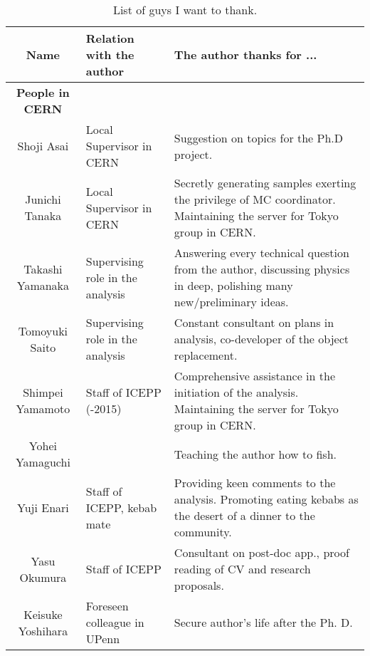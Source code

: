 \clearpage

\begin{table}[h]    
  \small
  \centering
  \caption{List of guys I want to thank.}
  \label{tab::Acknowledgement2}
  \begin{tabularx}{\linewidth}{clX}
    \toprule
    Name               & Relation with the author        & The author thanks for ... \\
    \midrule
    \midrule
    \textbf{People in CERN}     &               & \\
    \midrule
    Shoji Asai         &   Local Supervisor in CERN                                                       &  Suggestion on topics for the Ph.D project.   \\
    Junichi Tanaka     &   Local Supervisor in CERN                                                       &  Secretly generating samples exerting the privilege of MC coordinator. Maintaining the server for Tokyo group in CERN.   \\
    Takashi Yamanaka   &   Supervising role in the analysis                                                  &  Answering every technical question from the author, discussing physics in deep, polishing many new/preliminary ideas.  \\
    Tomoyuki Saito     &   Supervising role in the analysis                                                  &  Constant consultant on plans in analysis, co-developer of the object replacement.   \\   
    Shimpei Yamamoto   &   Staff of ICEPP (-2015)                                                         &  Comprehensive assistance in the initiation of the analysis. Maintaining the server for Tokyo group in CERN.  \\   
    Yohei Yamaguchi    &                                                                                  &  Teaching the author how to fish.  \\   
    Yuji Enari         &   Staff of ICEPP, kebab mate                                                     &  Providing keen comments to the analysis. Promoting eating kebabs as the desert of a dinner to the community.   \\   
    Yasu Okumura       &   Staff of ICEPP                                                                 &  Consultant on post-doc app., proof reading of CV and research proposals.   \\   
    Keisuke Yoshihara  &   Foreseen colleague in UPenn                                                    &  Secure author's life after the Ph. D.   \\   

\end{tabularx}
\end{table}
